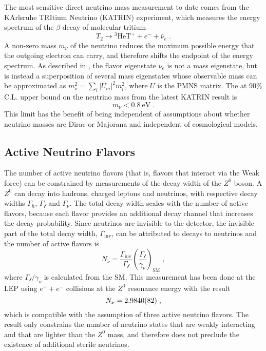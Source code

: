 The most sensitive direct neutrino mass measurement to date comes from the KArlsruhe TRItium Neutrino (KATRIN) experiment, which measures the energy spectrum of the $\beta$-decay of molecular tritium
\begin{equation}
    T_2 \rightarrow \mathrm{^3HeT^+} + e^- + \bar{\nu}_e\;.
\end{equation}
A non-zero mass $m_\nu$ of the neutrino reduces the maximum possible energy that the outgoing electron can carry, and therefore shifts the endpoint of the energy spectrum.
As described in , the flavor eigenstate $\nu_e$ is not a mass eigenstate, but is instead a superposition of several mass eigenstates whose observable mass can be approximated as $m^2_\nu = \sum_i |U_{ei}|^2m_i^2$, where $U$ is the PMNS matrix.
The at 90\% C.L.
upper bound on the neutrino mass from the latest KATRIN result\cite{KATRIN2022} is
\begin{equation}
    m_\nu < \SI{0.8}{\eV}\;.
\end{equation}
This limit has the benefit of being independent of assumptions about whether neutrino masses are Dirac or Majorana and independent of cosmological models.

\subsection{Active Neutrino Flavors}

The number of active neutrino flavors (that is, flavors that interact via the Weak force) can be constrained by measurements of the decay width of the $Z^0$ boson.
A $Z^0$ can decay into hadrons, charged leptons and neutrinos, with respective decay widths $\Gamma_h$, $\Gamma_\mathcal{l}$ and $\Gamma_\nu$.
The total decay width scales with the number of active flavors, because each flavor provides an additional decay channel that increases the decay probability.
Since neutrinos are invisible to the detector, the invisible part of the total decay width, $\Gamma_\mathrm{inv}$, can be attributed to decays to neutrinos and the number of active flavors is
\begin{equation}
    N_\nu = \frac{\Gamma_\mathrm{inv}}{\Gamma_\mathcal{l}}\left( \frac{\Gamma_\mathcal{l}}{\gamma_\nu} \right)_\mathrm{SM}\;,
\end{equation}
where $\Gamma_\mathcal{l} / \gamma_\nu$ is calculated from the SM. This measurement has been done at the LEP using $e^+ + e^-$ collisions at the $Z^0$ resonance energy with the result
\begin{equation}
    N_\nu = \num{2.9840 +- 0.0082}\;,
\end{equation}
which is compatible with the assumption of three active neutrino flavors.
The result only constrains the number of neutrino states that are weakly interacting and that are lighter than the $Z^0$ mass, and therefore does not preclude the existence of additional sterile neutrinos.




